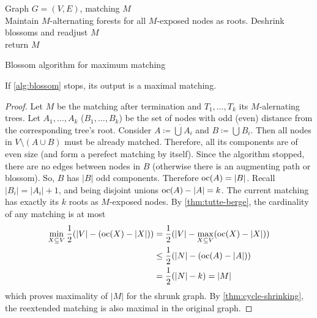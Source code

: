 
\begin{algorithm}[H]
    \SetAlgoLined
    Graph $G=(V,E)$, matching $M$\\
    Maintain $M$-alternating forests for all $M$-exposed nodes as roots.
    Deshrink blossoms and readjust $M$\\
    return $M$
    \caption{Blossom algorithm for maximum matching}
    \label{alg:blossom}
\end{algorithm} \noindent
\begin{theorem}
    If \autoref{alg:blossom} stops, its output is a maximal matching.
\end{theorem}
\begin{proof}
    Let $M$ be the matching after termination and $T_1, \dots, T_k$ its $M$-alernating trees.
    Let $A_1,\dots,A_k$ ($B_1,\dots,B_k$) be the set of nodes with odd (even) distance from the corresponding tree's root.
    Consider $A\coloneqq \dot\bigcup A_i$ and $B \coloneqq \dot\bigcup B_i$.
    Then all nodes in $V \setminus (A\cup B)$ must be already matched.
    Therefore, all its components are of even size (and form a perefect matching by itself).
    Since the algorithm stopped, there are no edges between nodes in $B$ (otherwise there is an augmenting path or blossom).
    So, $B$ has $|B|$ odd components.
    Therefore $\text{oc}(A) = |B|$. Recall $|B_i| = |A_i| +1$, and being disjoint unions $\text{oc}(A)-|A|=k$.
    The current matching has exactly its $k$ roots as $M$-exposed nodes.
    By \autoref{thm:tutte-berge}, the cardinality of any matching is at most
    \begin{align*}
        \min_{X \subseteq V} \frac{1}{2} (|V| - (\text{oc}(X) - |X|)) & =  \frac{1}{2} (|V| - \max_{X \subseteq V}(\text{oc}(X) - |X|)) \\
                                                                & \leq  \frac{1}{2} (|N| - (\text{oc}(A) - |A|))                  \\
                                                                & =  \frac{1}{2} (|N| - k) = |M|
    \end{align*}
    which proves maximality of $|M|$ for the shrunk graph.
    By \autoref{thm:cycle-shrinking}, the reextended matching is also maximal in the original graph.
\end{proof}
